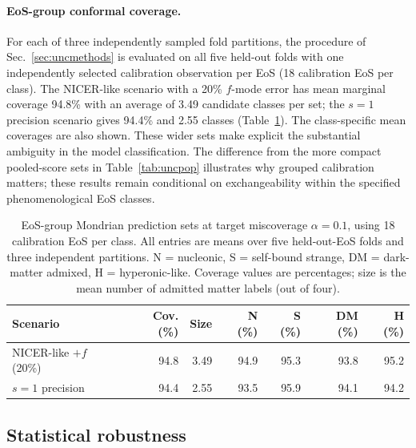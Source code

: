 \documentclass[11pt,a4paper]{article}
\begin{document}
\paragraph{EoS-group conformal coverage.}
For each of three independently sampled fold partitions, the procedure of Sec.~\ref{sec:uncmethods} is evaluated on all five held-out folds with one independently selected calibration observation per EoS (18 calibration EoS per class). The NICER-like scenario with a 20\% $f$-mode error has mean marginal coverage 94.8\% with an average of 3.49 candidate classes per set; the $s=1$ precision scenario gives 94.4\% and 2.55 classes (Table~\ref{tab:mondrian}). The class-specific mean coverages are also shown. These wider sets make explicit the substantial ambiguity in the model classification. The difference from the more compact pooled-score sets in Table~\ref{tab:uncpop} illustrates why grouped calibration matters; these results remain conditional on exchangeability within the specified phenomenological EoS classes.
\begin{table}[t]
\centering\small
\caption{EoS-group Mondrian prediction sets at target miscoverage $\alpha=0.1$, using 18 calibration EoS per class. All entries are means over five held-out-EoS folds and three independent partitions. N = nucleonic, S = self-bound strange, DM = dark-matter admixed, H = hyperonic-like. Coverage values are percentages; size is the mean number of admitted matter labels (out of four).}
\label{tab:mondrian}
\begin{tabular}{lrrrrrr}
\toprule
Scenario & Cov. (\%) & Size & N (\%) & S (\%) & DM (\%) & H (\%)\\
\midrule
NICER-like $+f$ (20\%) & 94.8 & 3.49 & 94.9 & 95.3 & 93.8 & 95.2\\
$s=1$ precision & 94.4 & 2.55 & 93.5 & 95.9 & 94.1 & 94.2\\
\bottomrule
\end{tabular}
\end{table}

\subsection{Statistical robustness}\label{sec:robust}
\end{document}
